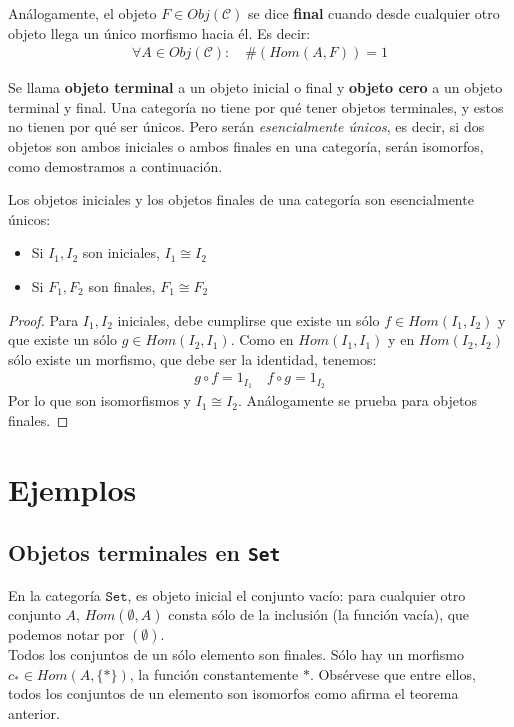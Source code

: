 \documentclass[11pt, fleqn, spanish]{book}
\newcommand{\C}{\mathcal{C} }
\begin{document}
    \begin{definition}
      Análogamente, el objeto $F \in Obj(\C)$ se dice \textbf{final} cuando desde cualquier otro objeto llega
      un único morfismo hacia él. Es decir:
      \begin{gather*}
	\forall A \in Obj(\C):\quad \#(Hom(A,F)) = 1
      \end{gather*}
    \end{definition}
 
    
    Se llama \textbf{objeto terminal} a un objeto inicial o final y \textbf{objeto cero} a un objeto
    terminal y final. Una categoría no tiene por qué
    tener objetos terminales, y estos no tienen por qué ser únicos. Pero serán \textit{esencialmente únicos},
    es decir, si dos objetos son ambos iniciales o ambos finales en una categoría, serán isomorfos,
    como demostramos a continuación.
    
    \begin{theorem} Los objetos iniciales y los objetos finales de una
    categoría son esencialmente únicos:
      \begin{itemize}
	\item Si $I_1,I_2$ son iniciales, $I_1 \cong I_2$
	\item Si $F_1,F_2$ son finales, $F_1 \cong F_2$
      \end{itemize}
    \end{theorem}

    \begin{proof}
      Para $I_1,I_2$ iniciales, debe cumplirse que existe un sólo $f \in Hom(I_1,I_2)$
      y que existe un sólo $g \in Hom(I_2,I_1)$. Como en $Hom(I_1,I_1)$ y en $Hom(I_2,I_2)$ sólo existe un morfismo,
      que debe ser la identidad, tenemos:
      \begin{gather*}
	g \circ f = 1_{I_1} \quad f \circ g = 1_{I_2}
      \end{gather*}
      Por lo que son isomorfismos y $I_1 \cong I_2$. Análogamente se prueba para objetos finales.
    \end{proof}
    
  \section {Ejemplos}
    \subsection {Objetos terminales en \texttt{Set}}
      En la categoría $\mathtt{Set}$, es objeto inicial el conjunto vacío: para cualquier otro
      conjunto $A$, $Hom(\emptyset, A)$ consta sólo de la inclusión (la función vacía), que 
      podemos notar por $(\emptyset)$. \\
      Todos los conjuntos de un sólo elemento son finales. Sólo hay un morfismo $c_\ast \in Hom(A,\{\ast\})$,
      la función constantemente $\ast$. Obsérvese que entre ellos, todos los conjuntos de un elemento
      son isomorfos como afirma el teorema anterior.
    
\end{document}
